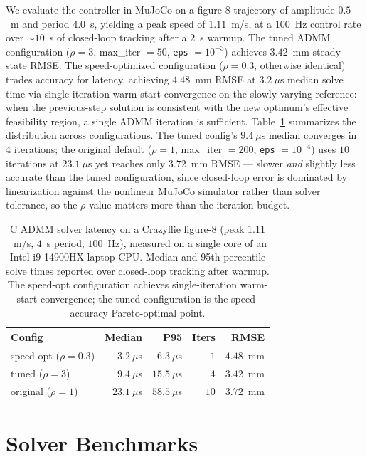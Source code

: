 \documentclass[conference]{IEEEtran}
\begin{document}
We evaluate the controller in MuJoCo on a figure-8 trajectory of amplitude $0.5$~m and period $4.0$~s, yielding a peak speed of $1.11$~m/s, at a $100$~Hz control rate over $\sim 10$~s of closed-loop tracking after a $2$~s warmup. The tuned ADMM configuration ($\rho=3$, max\_iter $=50$, \texttt{eps} $=10^{-3}$) achieves $3.42$~mm steady-state RMSE. The speed-optimized configuration ($\rho=0.3$, otherwise identical) trades accuracy for latency, achieving $4.48$~mm RMSE at $3.2~\mu$s median solve time via single-iteration warm-start convergence on the slowly-varying reference: when the previous-step solution is consistent with the new optimum's effective feasibility region, a single ADMM iteration is sufficient. Table~\ref{tab:latency} summarizes the distribution across configurations. The tuned config's $9.4~\mu$s median converges in $4$ iterations; the original default ($\rho=1$, max\_iter $=200$, \texttt{eps} $=10^{-4}$) uses $10$ iterations at $23.1~\mu$s yet reaches only $3.72$~mm RMSE --- slower \emph{and} slightly less accurate than the tuned configuration, since closed-loop error is dominated by linearization against the nonlinear MuJoCo simulator rather than solver tolerance, so the $\rho$ value matters more than the iteration budget.

\begin{table}[t]
\centering
\caption{C ADMM solver latency on a Crazyflie figure-8 (peak $1.11$~m/s, $4$~s period, $100$~Hz), measured on a single core of an Intel i9-14900HX laptop CPU. Median and 95th-percentile solve times reported over closed-loop tracking after warmup. The speed-opt configuration achieves single-iteration warm-start convergence; the tuned configuration is the speed-accuracy Pareto-optimal point.}
\label{tab:latency}
\begin{tabular}{lrrrr}
\toprule
\textbf{Config} & \textbf{Median} & \textbf{P95} & \textbf{Iters} & \textbf{RMSE} \\
\midrule
speed-opt ($\rho{=}0.3$) & $3.2~\mu$s & $6.3~\mu$s & $1$ & $4.48$~mm \\
tuned ($\rho{=}3$) & $9.4~\mu$s & $15.5~\mu$s & $4$ & $3.42$~mm \\
original ($\rho{=}1$) & $23.1~\mu$s & $58.5~\mu$s & $10$ & $3.72$~mm \\
\bottomrule
\end{tabular}
\end{table}

\section{Solver Benchmarks}
\end{document}
